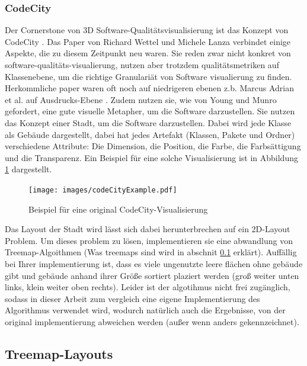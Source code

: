 \subsubsection{CodeCity} \label{sec:CodeCity}
Der Cornerstone von 3D Software-Qualitätsvisualisierung ist das Konzept von CodeCity \cite{codeCity1}. Das Paper von Richard Wettel und Michele Lanza verbindet einige Aspekte, die zu diesem Zeitpunkt neu waren. Sie reden zwar nicht konkret von software-qualitäts-visualierung, nutzen aber trotzdem qualitätsmetriken auf Klassenebene, um die richtige Granulariät von Software visualierung zu finden. Herkommliche paper waren oft noch auf niedrigeren ebenen z.b. Marcus Adrian et al. auf Ausdrucks-Ebene \cite{3dsoftwareMarcus}. Zudem nutzen sie, wie von Young und Munro \cite{visSoftwareVR} gefordert, eine gute visuelle Metapher, um die Software darzustellen. Sie nutzen das Konzept einer Stadt, um die Software darzustellen. Dabei wird jede Klasse als Gebäude dargestellt, dabei hat jedes Artefakt (Klassen, Pakete und Ordner) verschiedene Attribute: Die Dimension, die Position, die Farbe, die Farbsättigung und die Transparenz. Ein Beispiel für eine solche Visualisierung ist in Abbildung \ref{fig:codeCity} dargestellt.

\begin{figure}
    \centering
    \texttt{[image: images/codeCityExample.pdf]}
    \caption{Beispiel für eine original CodeCity-Visualisierung \cite[2]{codeCity1}}
    \label{fig:codeCity}
\end{figure}

Das Layout der Stadt wird lässt sich dabei herunterbrechen auf ein 2D-Layout Problem. Um dieses problem zu lösen, implementieren sie eine abwandlung von Treemap-Algoithmen (Was treemaps sind wird in abschnit \ref{sec:Treemap} erklärt). Auffällig bei Ihrer implementierung ist, dass es viele ungenutzte leere flächen ohne gebäude gibt und gebäude anhand ihrer Größe sortiert plaziert werden (groß weiter unten links, klein weiter oben rechts). Leider ist der algotihmus nicht frei zugänglich, sodass in dieser Arbeit zum vergleich eine eigene Implementierung des Algorithmus verwendet wird, wodurch natürlich auch die Ergebnisse, von der original implementierung abweichen werden (außer wenn anders gekennzeichnet).

\subsection{Treemap-Layouts} \label{sec:Treemap}

